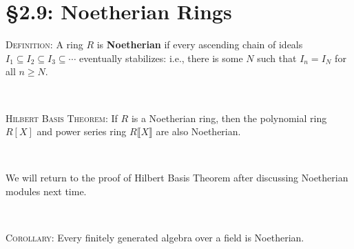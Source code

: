 \documentclass[12pt]{amsart}
\newcommand{\1}{\mathbbm{1}}
\newcommand{\showsol}[1]{\def\displaysol{#1}}
\begin{document}
\showsol{0}
	
	\thispagestyle{empty}
	
	\section*{\S2.9: Noetherian Rings}	

\begin{framed}

\noindent \textsc{Definition:} A ring $R$ is \textbf{Noetherian} if every ascending chain of ideals $I_1 \subseteq I_2 \subseteq I_3 \subseteq \cdots$ eventually stabilizes: i.e., there is some $N$ such that $I_n=I_N$ for all $n\geq N$.

\

\noindent \textsc{Hilbert Basis Theorem:} If $R$ is a Noetherian ring, then the polynomial ring $R[X]$ and power series ring $R\llbracket X \rrbracket$ are also Noetherian.

\

\noindent We will return to the proof of Hilbert Basis Theorem after discussing Noetherian modules next time.


\

\noindent \textsc{Corollary:} Every finitely generated algebra over a field is Noetherian.


 \end{framed}
 
\end{document}
